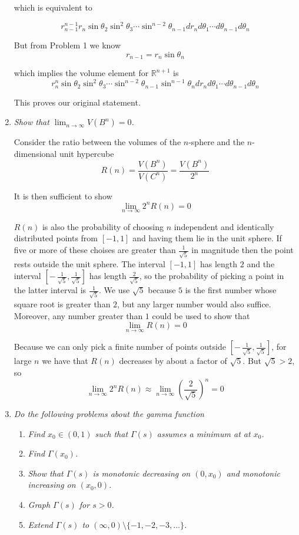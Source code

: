 \documentclass[11pt]{article}
\begin{document}
\begin{enumerate}
which is equivalent to

\[
r_{n-1}^{n-1} r_n\sin\theta_2 \sin^2\theta_3 \cdots \sin^{n-2}\theta_{n-1} dr_n d\theta_1 \cdots d\theta_{n-1} d\theta_n
\]

But from Problem 1 we know
\[
r_{n-1} = r_n \sin\theta_n
\]

which implies the volume element for $\mathbb{R}^{n+1}$ is
\[
r_n^n \sin\theta_2 \sin^2\theta_3 \cdots \sin^{n-2}\theta_{n-1}\sin^{n-1}\theta_n dr_n d\theta_1 \cdots d\theta_{n-1} d\theta_n
\]

This proves our original statement.

\item \emph{Show that $\lim_{n \rightarrow \infty} V(B^n) = 0$.}

Consider the ratio between the volumes of the $n$-sphere and the $n$-dimensional unit hypercube
\[
R(n) = \frac{V(B^n)}{V(C^n)} = \frac{V(B^n)}{2^n}
\]

It is then sufficient to show
\[
\lim_{n \rightarrow \infty} 2^n R(n) = 0
\]

$R(n)$ is also the probability of choosing $n$ independent and identically distributed points from $[-1,1]$ and having them lie in the unit sphere.  If five or more of these choises are greater than $\frac{1}{\sqrt{5}}$ in magnitude then the point rests outside the unit sphere.  The interval $[-1,1]$ has length $2$ and the interval $\left[-\,\frac{1}{\sqrt{5}},\frac{1}{\sqrt{5}}\right]$ has length $\frac{2}{\sqrt{5}}$, so the probability of picking a point in the latter interval is $\frac{1}{\sqrt{5}}$.  We use $\sqrt{5}$ because $5$ is the first number whose square root is greater than $2$, but any larger number would also suffice.  Moreover, any number greater than $1$ could be used to show that
\[
\lim_{n \rightarrow \infty} R(n) = 0
\]

Because we can only pick a finite number of points outside $\left[-\,\frac{1}{\sqrt{5}},\frac{1}{\sqrt{5}}\right]$, for large $n$ we have that $R(n)$ decreases by about a factor of $\sqrt{5}$.  But $\sqrt{5} > 2$, so
\[
\lim_{n \rightarrow \infty} 2^n R(n) \approx \lim_{n \rightarrow \infty} \left(\frac{2}{\sqrt{5}}\right)^n = 0
\]

\item \emph{Do the following problems about the gamma function}
\begin{enumerate}
\item \emph{Find $x_0 \in (0,1)$ such that $\Gamma(s)$ assumes a minimum at at $x_0$.}
\item \emph{Find $\Gamma(x_0)$.}
\item \emph{Show that $\Gamma(s)$ is monotonic decreasing on $(0,x_0)$ and monotonic increasing on $(x_0,0)$.}
\item \emph{Graph $\Gamma(s)$ for $s>0$.}
\item \emph{Extend $\Gamma(s)$ to $(\infty, 0) \setminus \{-1,-2,-3,\ldots\}$.}
\end{enumerate}


\end{enumerate}
\end{document}
